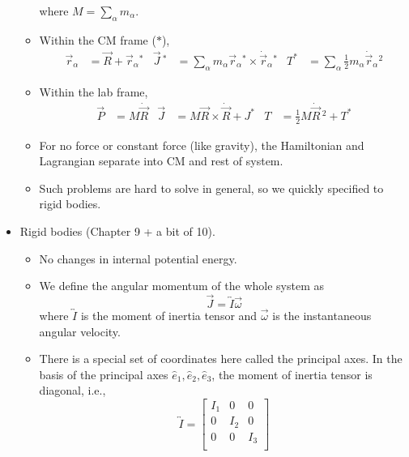 \documentclass[../notes.tex]{subfiles}
\begin{document}
\begin{itemize}
\begin{itemize}
        where $M=\sum_\alpha m_\alpha$.
        \item Within the CM frame ($*$),
        \begin{align*}
            \vec{r}_\alpha &= \vec{R}+\vec{r}_\alpha{}^*&
            \vec{J}{\,}^* &= \sum_\alpha m_\alpha\vec{r}_\alpha{}^*\times\dot{\vec{r}}_\alpha{}^*&
            T^* &= \sum_\alpha\frac{1}{2}m_\alpha\dot{\vec{r}}_\alpha{}^2
        \end{align*}
        \item Within the lab frame,
        \begin{align*}
            \vec{P} &= M\dot{\vec{R}}&
            \vec{J} &= M\vec{R}\times\dot{\vec{R}}+J^*&
            T &= \frac{1}{2}M\dot{\vec{R}}{\,}^2+T^*
        \end{align*}
        \item For no force or constant force (like gravity), the Hamiltonian and Lagrangian separate into CM and rest of system.
        \item Such problems are hard to solve in general, so we quickly specified to rigid bodies.
    \end{itemize}
    \item Rigid bodies (Chapter 9 + a bit of 10).
    \begin{itemize}
        \item No changes in internal potential energy.
        \item We define the angular momentum of the whole system as
        \begin{equation*}
            \vec{J} = \overleftrightarrow{I}\vec{\omega}
        \end{equation*}
        where $\overleftrightarrow{I}$ is the moment of inertia tensor and $\vec{\omega}$ is the instantaneous angular velocity.
        \item There is a special set of coordinates here called the principal axes. In the basis of the principal axes $\hat{e}_1,\hat{e}_2,\hat{e}_3$, the moment of inertia tensor is diagonal, i.e.,
        \begin{equation*}
            \overleftrightarrow{I} =
            \begin{bmatrix}
                I_1 & 0 & 0\\
                0 & I_2 & 0\\
                0 & 0 & I_3\\
            \end{bmatrix}
        \end{equation*}

\end{itemize}
\end{itemize}
\end{document}
